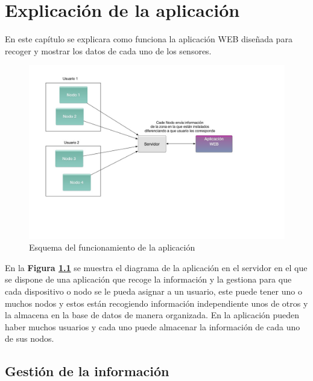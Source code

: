
\chapter{Explicación de la aplicación}

En este capítulo se explicara como funciona la aplicación WEB diseñada para recoger y mostrar los datos de cada uno de los sensores.

\begin{figure}[!h]
	\centering
	\includegraphics[width=0.9\linewidth]{figuras/montaje2}
	\caption{Esquema del funcionamiento de la aplicación}
	\label{fig:montaje2}
\end{figure}

\setlength{\parindent}{5ex}En la \textbf{Figura \ref{fig:montaje2}} se muestra el diagrama de la aplicación en el servidor en el que se dispone de una aplicación que recoge la información y la gestiona para que cada dispositivo o nodo se le pueda asignar a un usuario, este puede tener uno o muchos nodos y estos están recogiendo información independiente unos de otros y la almacena en la base de datos de manera organizada.
En la aplicación pueden haber muchos usuarios y cada uno puede almacenar la información de cada uno de sus nodos.

\clearpage

\section{Gestión de la información}


